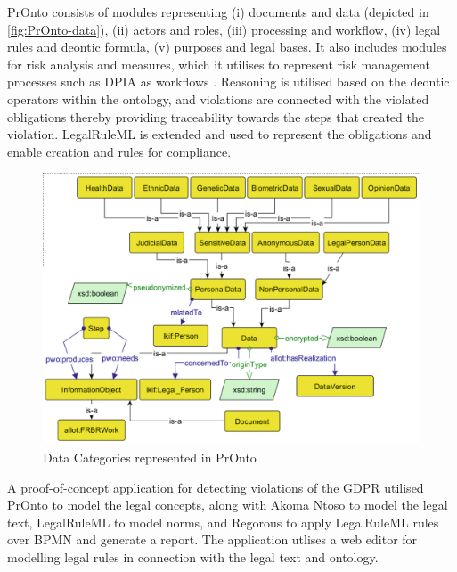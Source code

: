 PrOnto consists of modules representing (i) documents and data (depicted in \autoref{fig:PrOnto-data}), (ii) actors and roles, (iii) processing and workflow, (iv) legal rules and deontic formula, (v) purposes and legal bases. It also includes modules for risk analysis and measures, which it utilises to represent risk management processes such as DPIA as workflows \cite{palmirani_pronto:_2018}. Reasoning is utilised based on the deontic operators within the ontology, and violations are connected with the violated obligations thereby providing traceability towards the steps that created the violation. LegalRuleML is extended and used to represent the obligations and enable creation and rules for compliance.
\begin{figure}[htbp]
    \centering
    \includegraphics[width=0.8\linewidth]{img/PrOnto_data.png}
    \caption{Data Categories represented in PrOnto \cite{palmirani_pronto:_2018}}
    \label{fig:PrOnto-data}
\end{figure}

A proof-of-concept application for detecting violations of the GDPR \cite{monica_modelling_2018} utilised PrOnto to model the legal concepts, along with Akoma Ntoso to model the legal text, LegalRuleML to model norms, and Regorous to apply LegalRuleML rules over BPMN and generate a report. The application utlises a web editor for modelling legal rules in connection with the legal text and ontology.

